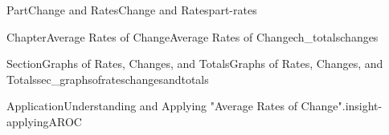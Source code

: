 \documentclass[oneside,10pt,]{tufte-book}
\numberwithin{equation}{chapter}
\def \tikzhistogram (#1,#2){\draw[fill=blue,opacity=0.3] ({#1+((\xtwo-\xmin)/5)},#2) rectangle ({#1-((\xtwo-\xmin)/5)},0); \draw[draw,thick] ({#1+((\xtwo-\xmin)/5)},#2) rectangle ({#1-((\xtwo-\xmin)/5)},0); \node[draw,fill=blue, circle,inner sep=2.5pt] at (#1,#2) {};}
\begin{document}
\begin{partptx}{Part}{Change and Rates}{}{Change and Rates}{}{}{part-rates}
\begin{chapterptx}{Chapter}{Average Rates of Change}{}{Average Rates of Change}{}{}{ch_totalschanges}
\begin{sectionptx}{Section}{Graphs of Rates, Changes, and Totals}{}{Graphs of Rates, Changes, and Totals}{}{}{sec_graphsofrateschangesandtotals}
\begin{insight}{Application}{Understanding and Applying "Average Rates of Change".}{insight-applyingAROC}
\begin{image}{0.3}{0.4}{0.3}{}
{}
\end{image}
\end{insight}
\end{sectionptx}
\end{chapterptx}
\end{partptx}
\end{document}
